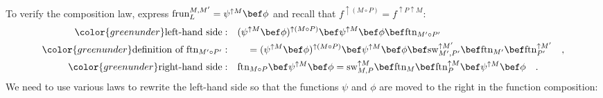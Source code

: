 To verify the composition law, express $\text{frun}_{L}^{M,M^{\prime}}=\psi^{\uparrow M}\bef\phi$
and recall that $f^{\uparrow(M\circ P)}=f^{\uparrow P\uparrow M}$:
\begin{align*}
{\color{greenunder}\text{left-hand side}:}\quad & (\psi^{\uparrow M}\bef\phi)^{\uparrow(M\circ P)}\bef\psi^{\uparrow M}\bef\phi\bef\text{ftn}_{M^{\prime}\circ P^{\prime}}\\
{\color{greenunder}\text{definition of }\text{ftn}_{M^{\prime}\circ P^{\prime}}:}\quad & \quad=(\psi^{\uparrow M}\bef\phi)^{\uparrow(M\circ P)}\bef\psi^{\uparrow M}\bef\phi\bef\text{sw}_{M^{\prime},P^{\prime}}^{\uparrow M^{\prime}}\bef\text{ftn}_{M^{\prime}}\bef\text{ftn}_{P^{\prime}}^{\uparrow M^{\prime}}\quad,\\
{\color{greenunder}\text{right-hand side}:}\quad & \text{ftn}_{M\circ P}\bef\psi^{\uparrow M}\bef\phi=\text{sw}_{M,P}^{\uparrow M}\bef\text{ftn}_{M}\bef\text{ftn}_{P}^{\uparrow M}\bef\psi^{\uparrow M}\bef\phi\quad.
\end{align*}
We need to use various laws to rewrite the left-hand side so that
the functions $\psi$ and $\phi$ are moved to the right in the function
composition:
